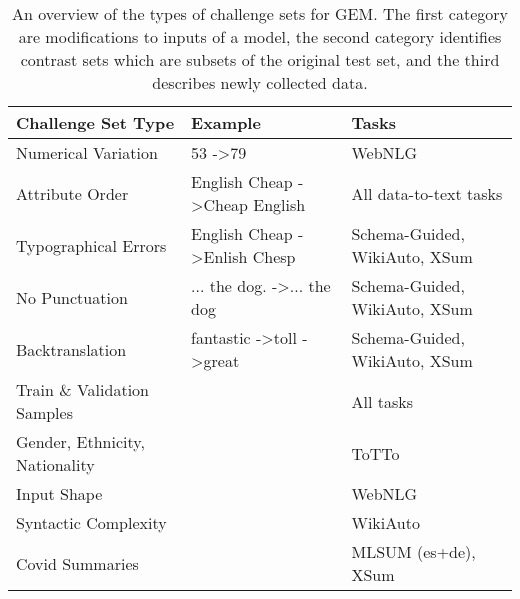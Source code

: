 \documentclass[11pt,a4paper]{article}
\begin{document}
\begin{table*}[t]
\begin{tabular}{@{}llm{15em}@{}}
\toprule
Challenge Set Type & Example & Tasks \\ \midrule
Numerical Variation & 53 -\textgreater 79 & WebNLG \\
Attribute Order & English Cheap -\textgreater Cheap English & All data-to-text tasks \\
Typographical Errors & English Cheap -\textgreater Enlish Chesp & Schema-Guided, WikiAuto, XSum \\
No Punctuation & ... the dog. -\textgreater ... the dog & Schema-Guided, WikiAuto, XSum \\
Backtranslation & fantastic -\textgreater toll -\textgreater great & Schema-Guided, WikiAuto, XSum \\ \midrule
Train \& Validation Samples &  & All tasks \\
Gender, Ethnicity, Nationality &  & ToTTo \\
Input Shape &  & WebNLG \\
Syntactic Complexity &  & WikiAuto \\ \midrule
Covid Summaries &  & MLSUM (es+de), XSum \\ \bottomrule 
\end{tabular}
\caption{An overview of the types of challenge sets for GEM. The first category are modifications to inputs of a model, the second category identifies contrast sets which are subsets of the original test set, and the third describes newly collected data.}
\label{tab:challenge-sets}
\end{table*}
\end{document}
